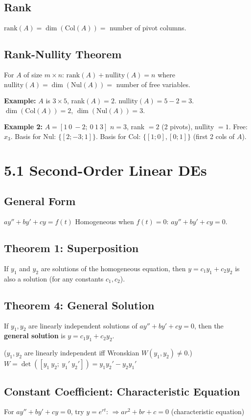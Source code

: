 \subsection{Rank}
$\text{rank}(A) = \dim(\text{Col}(A)) = $ number of pivot columns.

\subsection{Rank-Nullity Theorem}
For $A$ of size $m \times n$:
$\text{rank}(A) + \text{nullity}(A) = n$
where $\text{nullity}(A) = \dim(\text{Nul}(A)) = $ number of free variables.

\textbf{Example:} $A$ is $3 \times 5$, rank$(A) = 2$.
nullity$(A) = 5 - 2 = 3$.
$\dim(\text{Col}(A)) = 2$, $\dim(\text{Nul}(A)) = 3$.

\textbf{Example 2:} $A = [1\ 0\ -2;\ 0\ 1\ 3]$
$n = 3$, rank $= 2$ (2 pivots), nullity $= 1$.
Free: $x_3$. Basis for Nul: $\{[2;-3;1]\}$.
Basis for Col: $\{[1;0],[0;1]\}$ (first 2 cols of $A$).

\section{5.1 Second-Order Linear DEs}

\subsection{General Form}
$ay'' + by' + cy = f(t)$
Homogeneous when $f(t) = 0$: $ay'' + by' + cy = 0$.

\subsection{Theorem 1: Superposition}
If $y_1$ and $y_2$ are solutions of the homogeneous equation, then
$y = c_1 y_1 + c_2 y_2$ is also a solution (for any constants $c_1, c_2$).

\subsection{Theorem 4: General Solution}
If $y_1, y_2$ are linearly independent solutions of $ay''+by'+cy=0$,
then the \textbf{general solution} is $y = c_1 y_1 + c_2 y_2$.

($y_1, y_2$ are linearly independent iff Wronskian $W(y_1,y_2) \neq 0$.)
$W = \det([y_1\ y_2;\ y_1'\ y_2']) = y_1 y_2' - y_2 y_1'$

\subsection{Constant Coefficient: Characteristic Equation}
For $ay'' + by' + cy = 0$, try $y = e^{rt}$:
$\Rightarrow ar^2 + br + c = 0$ (characteristic equation)

